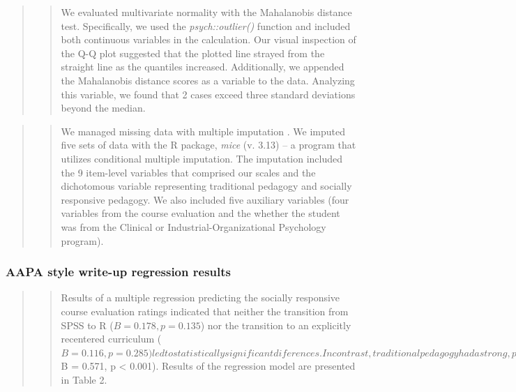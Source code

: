 \documentclass[
  11pt,
]{book}
\begin{document}
\begin{quote}
\begin{quote}
We evaluated multivariate normality with the Mahalanobis distance test. Specifically, we used the \emph{psych::outlier()} function and included both continuous variables in the calculation. Our visual inspection of the Q-Q plot suggested that the plotted line strayed from the straight line as the quantiles increased. Additionally, we appended the Mahalanobis distance scores as a variable to the data. Analyzing this variable, we found that 2 cases exceed three standard deviations beyond the median.
\end{quote}
\end{quote}

\begin{quote}
\begin{quote}
We managed missing data with multiple imputation \citep{enders_multiple_2017, katitas_getting_2019}. We imputed five sets of data with the R package, \emph{mice} (v. 3.13) -- a program that utilizes conditional multiple imputation. The imputation included the 9 item-level variables that comprised our scales and the dichotomous variable representing traditional pedagogy and socially responsive pedagogy. We also included five auxiliary variables (four variables from the course evaluation and the whether the student was from the Clinical or Industrial-Organizational Psychology program).
\end{quote}
\end{quote}

\hypertarget{aapa-style-write-up-regression-results}{%
\subsubsection{AAPA style write-up regression results}\label{aapa-style-write-up-regression-results}}

\begin{quote}
\begin{quote}
Results of a multiple regression predicting the socially responsive course evaluation ratings indicated that neither the transition from SPSS to R (\(B = 0.178, p = 0.135\)) nor the transition to an explicitly recentered curriculum (\(B = 0.116, p = 0.285) led to statistically significant diferences. In contrast, traditional pedagogy had a strong, positive effect on evaluations of socially responsive pedagogy (\)B = 0.571, p \textless{} 0.001). Results of the regression model are presented in Table 2.
\end{quote}
\end{quote}
\end{document}
